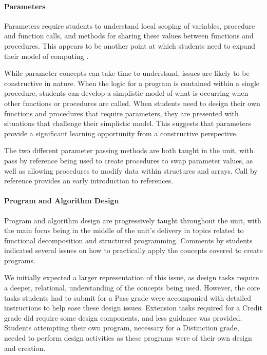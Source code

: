 \paragraph{Parameters} %
\label{ssub:parameters}

Parameters require students to understand local scoping of variables, procedure and function calls, and methods for sharing these values between functions and procedures. This appears to be another point at which students need to expand their model of computing \cite{Hoc:1990}. 

While parameter concepts can take time to understand, issues are likely to be constructive in nature. When the logic for a program is contained within a single procedure, students can develop a simplistic model of what is occurring when other functions or procedures are called. When students need to design their own functions and procedures that require parameters, they are presented with situations that challenge their simplistic model. This suggests that parameters provide a significant learning opportunity from a constructive perspective.

The two different parameter passing methods are both taught in the unit, with pass by reference being used to create procedures to swap parameter values, as well as allowing procedures to modify data within structures and arrays. Call by reference provides an early introduction to references. 




\paragraph{Program and Algorithm Design} %
\label{ssub:program_and_algorithm_design}

Program and algorithm design are progressively taught throughout the unit, with the main focus being in the middle of the unit's delivery in topics related to functional decomposition and structured programming. Comments by students indicated several issues on how to practically apply the concepts covered to create programs. 

We initially expected a larger representation of this issue, as design tasks require a deeper, relational, understanding of the concepts being used. However, the core tasks students had to submit for a Pass grade were accompanied with detailed instructions to help ease these design issues. Extension tasks required for a Credit grade did require some design components, and less guidance was provided. Students attempting their own program, necessary for a Distinction grade, needed to perform design activities as these programs were of their own design and creation.

